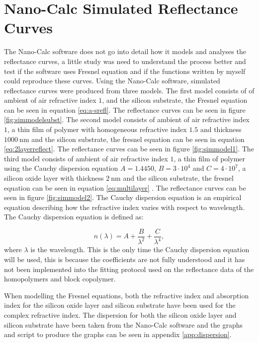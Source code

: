 \documentclass[MasterThesisMain.tex]{subfiles}
\begin{document}
\section{Nano-Calc Simulated Reflectance Curves}
The Nano-Calc software does not go into detail how it models and analyses the reflectance curves, a little study was need to understand the process better and test if the software uses Fresnel equation and if the functions written by myself could reproduce these curves. Using the Nano-Calc software, simulated reflectance curves were produced from three models. The first model consists of of ambient of air refractive index $1$, and the silicon substrate, the Fresnel equation can be seen in equation \ref{eq:a-srefl}. The reflectance curves can be seen in figure \ref{fig:simmodelsubst}. The second model consists of ambient of air refractive index $1$, a thin film of polymer with homogeneous refractive index $1.5$ and thickness $\SI{1000}{\nano\meter}$ and the silicon substrate, the fresnel equation can be seen in equation \ref{eq:2layerreflect}. The reflectance curves can be seen in figure \ref{fig:simmodel1}. The third model consists of ambient of air refractive index $1$, a thin film of polymer using the Cauchy dispersion equation $A=1.4450$, $B=3 \cdot 10^4$ and $C=4 \cdot 10^7$, a silicon oxide layer with thickness $\SI{2}{\nano\meter}$ and the silicon substrate, the fresnel equation can be seen in equation \ref{eq:multilayer} . The reflectance curves can be seen in figure \ref{fig:simmodel2}. The Cauchy dispersion equation is an empirical equation describing how the refractive index varies with respect to wavelength. The Cauchy dispersion equation is defined as:

\begin{equation}
n(\lambda) = A + \frac{B}{\lambda^2} + \frac{C}{\lambda^4},
\end{equation}
where $\lambda$ is the wavelength. This is the only time the Cauchy dispersion equation will be used, this is because the coefficients are not fully understood and it has not been implemented into the fitting protocol used on the reflectance data of the homopolymers and block copolymer. 

When modelling the Fresnel equations, both the refractive index and absorption index for the silicon oxide layer and silicon substrate have been used for the complex refractive index. The dispersion for both the silicon oxide layer and silicon substrate have been taken from the Nano-Calc software and the graphs and script to produce the graphs can be seen in appendix \ref{app:dispersion}.  
\end{document}
